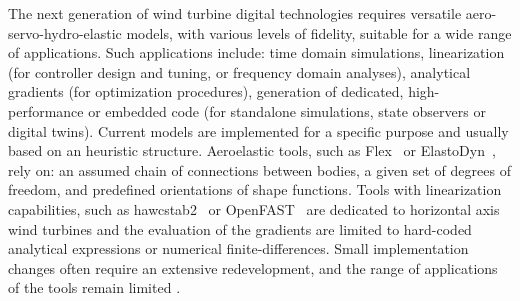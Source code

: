 \documentclass[wes, manuscript]{copernicus}
\renewcommand{\v}[1]{\boldsymbol{#1}}
\begin{document}


\introduction 

The next generation of wind turbine digital technologies requires versatile aero-servo-hydro-elastic
models, with various levels of fidelity, suitable for a wide range of applications. 
Such applications include: time domain simulations, linearization (for controller design and tuning, or frequency domain analyses), analytical gradients (for optimization procedures), generation of dedicated, high-performance or embedded code (for standalone simulations, state observers or digital twins). 
Current models are implemented for a specific purpose and usually based on an heuristic structure.
Aeroelastic tools, such as Flex~\citep{flexoye,branlard:2019flex} or ElastoDyn~\citep{openfast}, rely on: an assumed chain of connections between bodies, a given set of degrees of freedom, and predefined orientations of shape functions.
Tools with linearization capabilities, such as hawcstab2~\citep{Sonderby:2014} or OpenFAST~\citep{openfast} are dedicated to horizontal axis wind turbines and the evaluation of the gradients are limited to hard-coded analytical expressions or numerical finite-differences. 
Small implementation changes often require an extensive redevelopment, and the range of applications of the tools remain limited \citep{Simani:2015}.
\end{document}
